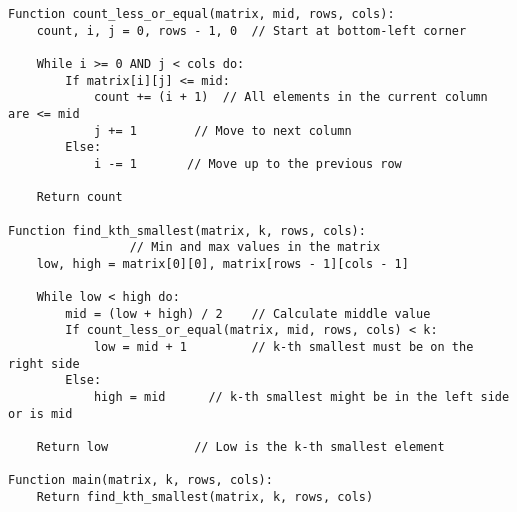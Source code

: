 \documentclass[a4paper,12pt]{report}
\begin{document}
\begin{tcolorbox}[colback=white, colframe=black, boxrule=0.5pt]
\ttfamily\small
\begin{verbatim}
Function count_less_or_equal(matrix, mid, rows, cols):
    count, i, j = 0, rows - 1, 0  // Start at bottom-left corner
    
    While i >= 0 AND j < cols do:
        If matrix[i][j] <= mid:
            count += (i + 1)  // All elements in the current column are <= mid
            j += 1        // Move to next column
        Else:
            i -= 1       // Move up to the previous row
    
    Return count

Function find_kth_smallest(matrix, k, rows, cols):
				 // Min and max values in the matrix
    low, high = matrix[0][0], matrix[rows - 1][cols - 1] 
    
    While low < high do:
        mid = (low + high) / 2    // Calculate middle value
        If count_less_or_equal(matrix, mid, rows, cols) < k:
            low = mid + 1         // k-th smallest must be on the right side
        Else:
            high = mid      // k-th smallest might be in the left side or is mid
    
    Return low            // Low is the k-th smallest element

Function main(matrix, k, rows, cols):
    Return find_kth_smallest(matrix, k, rows, cols)
\end{verbatim}
\end{tcolorbox}
\end{document}
